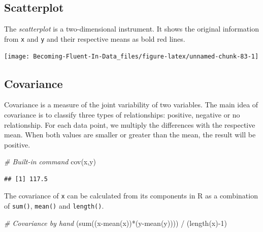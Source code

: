 \documentclass[
]{book}
\newenvironment{Shaded}{\begin{snugshade}}{\end{snugshade}}
\newcommand{\CommentTok}[1]{\textcolor[rgb]{0.56,0.35,0.01}{\textit{#1}}}
\newcommand{\DecValTok}[1]{\textcolor[rgb]{0.00,0.00,0.81}{#1}}
\newcommand{\FunctionTok}[1]{\textcolor[rgb]{0.00,0.00,0.00}{#1}}
\newcommand{\NormalTok}[1]{#1}
\newcommand{\SpecialCharTok}[1]{\textcolor[rgb]{0.00,0.00,0.00}{#1}}
\begin{document}
\hypertarget{scatterplot}{%
\subsection{Scatterplot}\label{scatterplot}}

The \emph{scatterplot} is a two-dimensional instrument. It shows the original information from \texttt{x} and \texttt{y} and their respective means as bold red lines.

\begin{center}\texttt{[image: Becoming-Fluent-In-Data\_files/figure-latex/unnamed-chunk-83-1]} \end{center}

\hypertarget{covariance}{%
\subsection{Covariance}\label{covariance}}

Covariance is a measure of the joint variability of two variables. The main idea of covariance is to classify three types of relationships: positive, negative or no relationship. For each data point, we multiply the differences with the respective mean. When both values are smaller or greater than the mean, the result will be positive.

\begin{Shaded}
\begin{Highlighting}[]
\CommentTok{\# Built{-}in command}
\FunctionTok{cov}\NormalTok{(x,y)}
\end{Highlighting}
\end{Shaded}

\begin{verbatim}
## [1] 117.5
\end{verbatim}

The covariance of \texttt{x} can be calculated from its components in R as a combination of \texttt{sum()}, \texttt{mean()} and \texttt{length()}.

\begin{Shaded}
\begin{Highlighting}[]
\CommentTok{\# Covariance by hand}
\NormalTok{(}\FunctionTok{sum}\NormalTok{((x}\SpecialCharTok{{-}}\FunctionTok{mean}\NormalTok{(x))}\SpecialCharTok{*}\NormalTok{(y}\SpecialCharTok{{-}}\FunctionTok{mean}\NormalTok{(y)))) }\SpecialCharTok{/}\NormalTok{ (}\FunctionTok{length}\NormalTok{(x)}\SpecialCharTok{{-}}\DecValTok{1}\NormalTok{)}
\end{Highlighting}
\end{Shaded}
\end{document}

